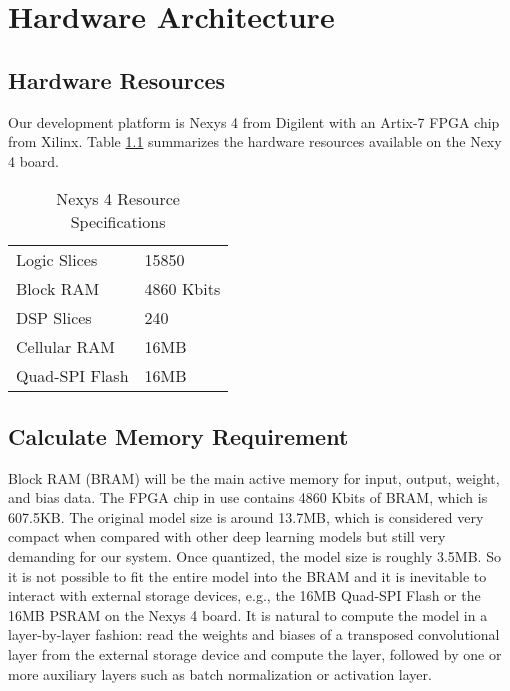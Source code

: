
\chapter{Hardware Architecture}

\section{Hardware Resources}

Our development platform is Nexys 4 from Digilent with an Artix-7 FPGA chip from Xilinx.
Table \ref{table:hardware_resources} summarizes the hardware resources available on the Nexy 4 board.

\begin{table}[h]
  \centering
  \caption{Nexys 4 Resource Specifications}
  \begin{tabular}{l | l}
    Logic Slices & 15850 \\
    Block RAM & 4860 Kbits \\
    DSP Slices & 240 \\
    Cellular RAM & 16MB \\
    Quad-SPI Flash & 16MB
  \end{tabular}
  \label{table:hardware_resources}
\end{table}

\section{Calculate Memory Requirement}

Block RAM (BRAM) will be the main active memory for input, output, weight, and bias data. The FPGA chip in use
contains 4860 Kbits of BRAM, which is 607.5KB. The original model size is around 13.7MB, which is
considered very compact when compared with other deep learning models but still very demanding for
our system. Once quantized, the model size is roughly 3.5MB. So it is not possible to fit the entire model
into the BRAM and it is inevitable to interact with external storage devices, e.g., the 16MB Quad-SPI Flash
or the 16MB PSRAM on the Nexys 4 board. It is natural to compute the model in a layer-by-layer fashion: read
the weights and biases of a transposed convolutional layer from the external storage device and compute the
layer, followed by one or more auxiliary layers such as batch normalization or activation layer.

